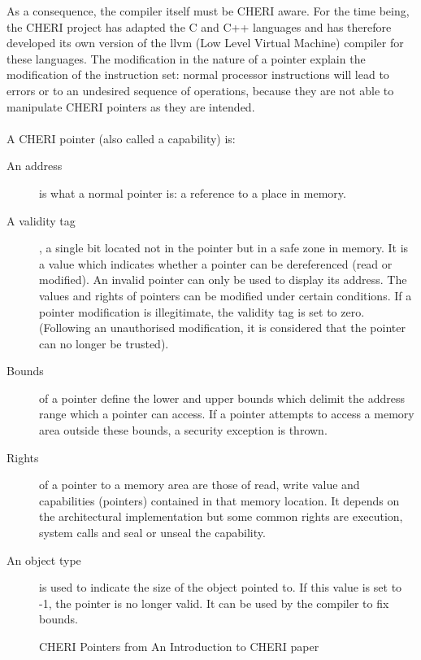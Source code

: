 \documentclass[a4paper, 11pt]{article}
\begin{document}
As a consequence, the compiler itself must be CHERI aware. For the time being, the CHERI project has adapted the C and C++ languages and has therefore developed its own version of the \acrshort{llvm} (Low Level Virtual Machine) compiler for these languages.
The modification in the nature of a pointer explain the modification of the instruction set: normal processor instructions will lead to errors or to an undesired sequence of operations, because they are not able to manipulate CHERI pointers as they are intended. 
\\\\
A CHERI pointer (also called a capability) is:
\begin{description}
	\item[An address] is what a normal pointer is: a reference to a place in memory.
	\item[A validity tag], a single bit located not in the pointer but in a safe zone in memory. It is a value which indicates whether a pointer can be dereferenced (read or modified). An invalid pointer can only be used to display its address. The values and rights of pointers can be modified under certain conditions. If a pointer modification is illegitimate, the validity tag is set to zero. (Following an unauthorised modification, it is considered that the pointer can no longer be trusted). 
	\item[Bounds] of a pointer define the lower and upper bounds which delimit the address range which a pointer can access. If a pointer attempts to access a memory area outside these bounds, a security exception is thrown.
	\item[Rights] of a pointer to a memory area are those of read, write value and capabilities (pointers) contained in that memory location. It depends on the architectural implementation but some common rights are execution, system calls and seal or unseal the capability.
	\item[An object type] is used to indicate the size of the object pointed to. If this value is set to -1, the pointer is no longer valid. It can be used by the compiler to fix bounds.
 \end{description}
 \begin{figure}[h!]
	\centering
	\caption{CHERI Pointers from An Introduction to CHERI paper}
\end{figure}
\end{document}
